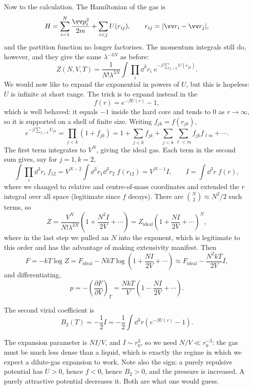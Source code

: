 Now to the calculation. The Hamiltonian of the gas is
$$
H = \sum_{i=1}^N \frac{\vv p_i^2}{2m} + \sum_{i < j} U(r_{ij}), \qquad r_{ij} = |\vv r_i - \vv r_j|,
$$
and the partition function no longer factorises. The momentum integrals still do, however, and they give the same $\lambda^{-3N}$ as before:
$$
Z(N,V,T) = \frac{1}{N!\lambda^{3N}}\int \prod_i \dd^3 r_i \; e^{-\beta\sum_{j<k}U(r_{jk})}.
$$
We would now like to expand the exponential in powers of $U$, but this is hopeless: $U$ is infinite at short range. The trick is to expand instead in the 
$$
f(r) = e^{-\beta U(r)} - 1,
$$
which is well behaved: it equals $-1$ inside the hard core and tends to $0$ as $r \to \infty$, so it is supported on a shell of finite size. Writing $f_{jk} = f(r_{jk})$,
$$
e^{-\beta\sum_{j<k}U_{jk}} = \prod_{j<k}(1+f_{jk}) = 1 + \sum_{j<k}f_{jk} + \sum_{j<k}\sum_{\ell<m}f_{jk}f_{\ell m} + \cdots.
$$
The first term integrates to $V^N$, giving the ideal gas. Each term in the second sum gives, say for $j=1,k=2$,
$$
\int \prod_i \dd^3 r_i \; f_{12} = V^{N-2}\int \dd^3 r_1 \dd^3 r_2 \; f(r_{12}) = V^{N-1} I, \qquad I = \int \dd^3 r\; f(r),
$$
where we changed to relative and centre-of-mass coordinates and extended the $r$ integral over all space (legitimate since $f$ decays). There are $\binom N2 \approx N^2/2$ such terms, so
$$
Z = \frac{V^N}{N!\lambda^{3N}}\left(1 + \frac{N^2 I}{2V} + \cdots\right) = Z_{\mathrm{ideal}}\left(1 + \frac{NI}{2V}+\cdots\right)^N,
$$
where in the last step we pulled an $N$ into the exponent, which is legitimate to this order and has the advantage of making extensivity manifest. Then
$$
F = -kT\log Z = F_{\mathrm{ideal}} - NkT\log\left(1 + \frac{NI}{2V}+\cdots\right) \approx F_{\mathrm{ideal}} - \frac{N^2 kT}{2V}I,
$$
and differentiating,
$$
p = -\left(\frac{\partial F}{\partial V}\right)_T = \frac{NkT}{V}\left(1 - \frac{NI}{2V}+\cdots\right).
$$

\begin{proposition}
	The second virial coefficient is
	$$
	B_2(T) = -\frac 12 I = -\frac 12\int \dd^3 r \left(e^{-\beta U(r)}-1\right).
	$$
\end{proposition}

The expansion parameter is $NI/V$, and $I \sim r_0^3$, so we need $N/V \ll r_0^{-3}$: the gas must be much less dense than a liquid, which is exactly the regime in which we expect a dilute-gas expansion to work. Note also the sign: a purely repulsive potential has $U > 0$, hence $f < 0$, hence $B_2 > 0$, and the pressure is increased. A purely attractive potential decreases it. Both are what one would guess.


